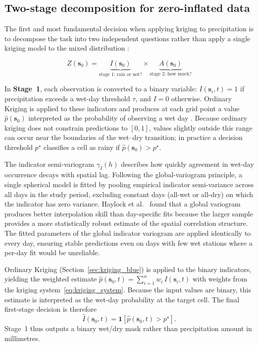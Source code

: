 \subsection{Two-stage decomposition for zero-inflated data}
\label{sec:kriging-indicator}

The first and most fundamental decision when applying kriging to precipitation
is to decompose the task into two independent questions
rather than apply a single kriging model to the mixed distribution
\cite{journel1983indicator, haylock2008european}:

\begin{equation}
  Z(\mathbf{s}_0) =
    \underbrace{I(\mathbf{s}_0)}_{\text{stage 1: rain or not?}}
    \times
    \underbrace{A(\mathbf{s}_0)}_{\text{stage 2: how much?}}
  \label{eq:two-stage}
\end{equation}

In \textbf{Stage~1}, each observation is converted to a binary variable:
$I(\mathbf{s}_i, t) = 1$ if precipitation exceeds a wet-day threshold $\tau$, and $I = 0$ otherwise.
Ordinary Kriging is applied to these indicators and produces at each grid point a
value $\hat{p}(\mathbf{s}_0)$ interpreted as the probability of observing a wet day
\cite{hofstra2008comparison}.
Because ordinary kriging does not constrain predictions to $[0,1]$, values
slightly outside this range can occur near the boundaries of the wet--dry transition;
in practice a decision threshold $p^{\star}$ classifies a cell as rainy if
$\hat{p}(\mathbf{s}_0) > p^{\star}$.

The indicator semi-variogram $\gamma_I(h)$ describes how quickly agreement
in wet-day occurrence decays with spatial lag.
Following the global-variogram principle, a single spherical model is fitted by
pooling empirical indicator semi-variance across all days in the study period,
excluding constant days (all-wet or all-dry) on which the indicator has zero
variance.
Haylock et al.~\cite{haylock2008european} found that a global variogram produces
better interpolation skill than day-specific fits because the larger sample
provides a more statistically robust estimate of the spatial correlation
structure.
The fitted parameters of the global indicator variogram are applied
identically to every day, ensuring stable predictions even on days with
few wet stations where a per-day fit would be unreliable.

Ordinary Kriging (Section~\ref{sec:kriging_blue}) is applied to the binary
indicators, yielding the weighted estimate
$\hat{p}(\mathbf{s}_0, t) = \sum_{i=1}^{n} w_i\, I(\mathbf{s}_i, t)$
with weights from the kriging system~\eqref{eq:kriging_system}.
Because the input values are binary, this estimate is interpreted as the
wet-day probability at the target cell. The final first-stage decision is therefore
\begin{equation}
  \widehat{I}(\mathbf{s}_0, t)
  =
  \mathbf{1}\!\left[\hat{p}(\mathbf{s}_0, t) > p^{\star}\right].
  \label{eq:indicator-decision}
\end{equation}
Stage~1 thus outputs a binary wet/dry mask rather than precipitation amount in
millimetres.

